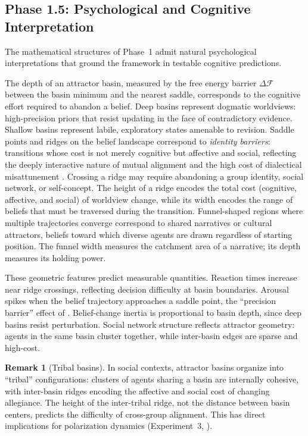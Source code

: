 \documentclass[11pt,a4paper]{article}
\theoremstyle{definition}
\newtheorem{remark}[claim]{Remark}
\newcommand{\VFE}{\mathcal{F}}
\begin{document}
\subsection{Phase 1.5: Psychological and Cognitive Interpretation}
\label{sec:phase1p5}

The mathematical structures of Phase~1 admit natural psychological interpretations that ground the framework in testable cognitive predictions.

The depth of an attractor basin, measured by the free energy barrier $\Delta \VFE$ between the basin minimum and the nearest saddle, corresponds to the cognitive effort required to abandon a belief. Deep basins represent dogmatic worldviews: high-precision priors that resist updating in the face of contradictory evidence. Shallow basins represent labile, exploratory states amenable to revision. Saddle points and ridges on the belief landscape correspond to \emph{identity barriers}: transitions whose cost is not merely cognitive but affective and social, reflecting the deeply interactive nature of mutual alignment and the high cost of dialectical misattunement \citep{schilbach2013, friston2015, bolis2017}. Crossing a ridge may require abandoning a group identity, social network, or self-concept. The height of a ridge encodes the total cost (cognitive, affective, and social) of worldview change, while its width encodes the range of beliefs that must be traversed during the transition. Funnel-shaped regions where multiple trajectories converge correspond to shared narratives or cultural attractors, beliefs toward which diverse agents are drawn regardless of starting position. The funnel width measures the catchment area of a narrative; its depth measures its holding power.

These geometric features predict measurable quantities. Reaction times increase near ridge crossings, reflecting decision difficulty at basin boundaries. Arousal spikes when the belief trajectory approaches a saddle point, the ``precision barrier'' effect of \citet{albarracin2024shared}. Belief-change inertia is proportional to basin depth, since deep basins resist perturbation. Social network structure reflects attractor geometry: agents in the same basin cluster together, while inter-basin edges are sparse and high-cost.

\begin{remark}[Tribal basins]
\label{rem:tribal_basins}
In social contexts, attractor basins organize into ``tribal'' configurations: clusters of agents sharing a basin are internally cohesive, with inter-basin ridges encoding the affective and social cost of changing allegiance. The height of the inter-tribal ridge, not the distance between basin centers, predicts the difficulty of cross-group alignment. This has direct implications for polarization dynamics (Experiment~3, ).
\end{remark}
\end{document}
